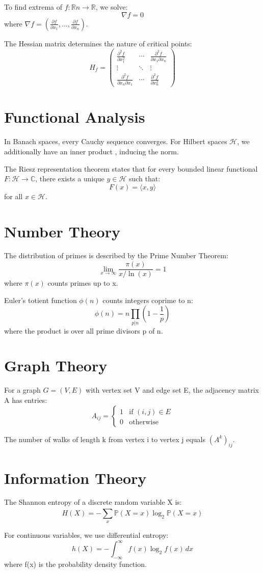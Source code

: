 \documentclass{article}
\newcommand{\innerproduct}[2]{\langle #1, #2 \rangle}
\newcommand{\real}{\mathbb{R}}
\newcommand{\complex}{\mathbb{C}}
\newcommand{\probability}[1]{\mathbb{P}(#1)}
\newcommand{\partialderivative}[2]{\frac{\partial #1}{\partial #2}}
\newcommand{\integral}[4]{\int_{#1}^{#2} #3 \, d#4}
\newcommand{\limit}[3]{\lim_{#1 \to #2} #3}
\newcommand{\series}[3]{\sum_{#1}^{#2} #3}
\newcommand{\product}[3]{\prod_{#1}^{#2} #3}
\begin{document}
To find extrema of \(f: \real{n} \to \real{}\), we solve:
\[\nabla f = 0\]
where \(\nabla f = \left(\partialderivative{f}{x_1}, \ldots, \partialderivative{f}{x_n}\right)\).

The Hessian matrix determines the nature of critical points:
\[H_f = \begin{pmatrix}
\frac{\partial^2 f}{\partial x_1^2} & \cdots & \frac{\partial^2 f}{\partial x_1 \partial x_n} \\
\vdots & \ddots & \vdots \\
\frac{\partial^2 f}{\partial x_n \partial x_1} & \cdots & \frac{\partial^2 f}{\partial x_n^2}
\end{pmatrix}\]

\section{Functional Analysis}

In Banach spaces, every Cauchy sequence converges. For Hilbert spaces \(\mathcal{H}\), we additionally have an inner product \innerproduct{\cdot}{\cdot} inducing the norm.

The Riesz representation theorem states that for every bounded linear functional \(F: \mathcal{H} \to \complex{}\), there exists a unique \(y \in \mathcal{H}\) such that:
\[F(x) = \innerproduct{x}{y}\]
for all \(x \in \mathcal{H}\).

\section{Number Theory}

The distribution of primes is described by the Prime Number Theorem:
\[\limit{x}{\infty}{\frac{\pi(x)}{x/\ln(x)}} = 1\]
where \(\pi(x)\) counts primes up to x.

Euler's totient function \(\phi(n)\) counts integers coprime to n:
\[\phi(n) = n \product{p|n}{}{}\left(1 - \frac{1}{p}\right)\]
where the product is over all prime divisors p of n.

\section{Graph Theory}

For a graph \(G = (V, E)\) with vertex set V and edge set E, the adjacency matrix A has entries:
\[A_{ij} = \begin{cases}
1 & \text{if } (i,j) \in E \\
0 & \text{otherwise}
\end{cases}\]

The number of walks of length k from vertex i to vertex j equals \((A^k)_{ij}\).

\section{Information Theory}

The Shannon entropy of a discrete random variable X is:
\[H(X) = -\series{x}{}{\probability{X=x} \log_2 \probability{X=x}}\]

For continuous variables, we use differential entropy:
\[h(X) = -\integral{-\infty}{\infty}{f(x) \log_2 f(x)}{x}\]
where f(x) is the probability density function.
\end{document}
